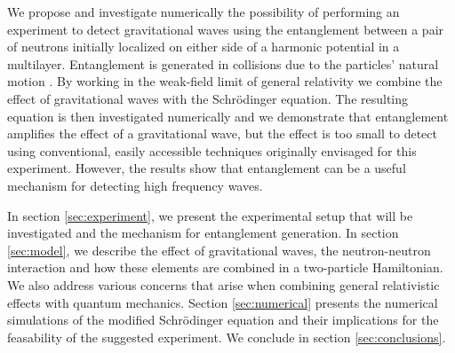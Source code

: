 We propose and investigate numerically the possibility of performing
an experiment to detect gravitational waves using the entanglement
between a pair of neutrons initially localized on either side of a
harmonic potential in a multilayer. Entanglement is generated in
collisions due to the particles' natural motion \cite{edmund}. By
working in the weak-field limit of general relativity we combine the
effect of gravitational waves with the Schr\"{o}dinger equation. The
resulting equation is then investigated numerically and we demonstrate
that entanglement amplifies the effect of a gravitational wave, but
the effect is too small to detect using conventional, easily
accessible techniques originally envisaged for this
experiment. However, the results show that entanglement can be a
useful mechanism for detecting high frequency waves.

In section \ref{sec:experiment}, we present the experimental setup
that will be investigated and the mechanism for entanglement
generation. In section \ref{sec:model}, we describe the effect of
gravitational waves, the neutron-neutron interaction and how these
elements are combined in a two-particle Hamiltonian. We also address
various concerns that arise when combining general relativistic
effects with quantum mechanics. Section \ref{sec:numerical} presents
the numerical simulations of the modified Schr\"{o}dinger equation and
their implications for the feasability of the suggested experiment. We
conclude in section \ref{sec:conclusions}.


